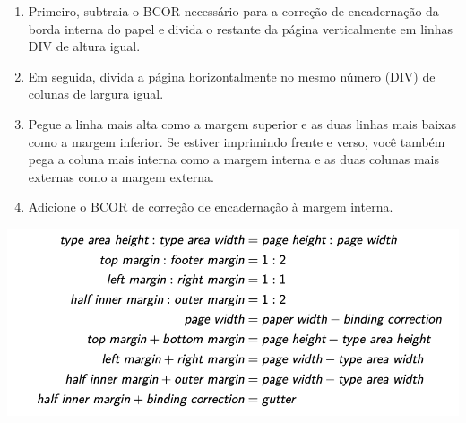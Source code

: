  \begin{enumerate}
     \item Primeiro, subtraia o BCOR necessário para a correção de encadernação da borda interna do papel e divida o restante da página verticalmente em linhas DIV de altura igual.
     \item Em seguida, divida a página horizontalmente no mesmo número (DIV) de colunas de largura igual.
     \item Pegue a linha mais alta como a margem superior e as duas linhas mais baixas como a margem inferior. Se estiver imprimindo frente e verso, você também pega a coluna mais interna como a margem interna e as duas colunas mais externas como a margem externa.
     \item Adicione o BCOR de correção de encadernação à margem interna.
 \end{enumerate}
\bigskip
\includegraphics[scale=0.8]{imagem01.png}
